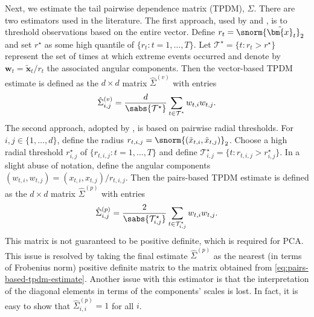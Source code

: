 \documentclass[en-GB, a4paper, nobind]{templates/bathreport}
\begin{document}
Next, we estimate the tail pairwise dependence matrix (TPDM), \(\Sigma\). There are two estimators used in the literature. The first approach, used by \textcite{cooleyDecompositionsDependenceHighdimensional2019} and \textcite{rohrbeckSimulatingFloodEvent2021}, is to threshold observations based on the entire vector. Define \(r_t=\snorm{\tilde{\bm{x}}_t}_2\) and set \(r^\star\) as some high quantile of \(\{r_t : t=1,\ldots,T\}\). Let \(\mathcal{T}^\star=\{t:r_t>r^\star\}\) represent the set of times at which extreme events occurred and denote by \(\bm{w}_{t}=\tilde{\bm{x}}_{t}/r_t\) the associated angular components. Then the vector-based TPDM estimate is defined as the \(d\times d\) matrix \(\hat{\Sigma}^{(v)}\) with entries
\begin{equation}
\hat{\Sigma}_{i,j}^{(v)} = \frac{d}{\sabs{\mathcal{T}^\star}}\sum_{t\in\mathcal{T}^\star} w_{t,i}w_{t,j}.
\label{eq:vector-based-tpdm-estimate}
\end{equation}
The second approach, adopted by \textcite{jiangPrincipalComponentAnalysis2020}, is based on pairwise radial thresholds. For \(i,j\in\{1,\ldots,d\}\), define the radius \(r_{t,i,j}=\snorm{(\tilde{x}_{t,i},\tilde{x}_{t,j})}_2\). Choose a high radial threshold \(r_{i,j}^\star\) of \(\{r_{t,i,j} : t=1,\ldots,T\}\) and define \(\mathcal{T}_{i,j}^\star=\{t:r_{t,i,j}>r_{i,j}^\star\}\). In a slight abuse of notation, define the angular components \((w_{t,i},w_{t,j})=(x_{t,i},x_{t,j})/r_{t,i,j}\). Then the pairs-based TPDM estimate is defined as the \(d\times d\) matrix \(\hat{\Sigma}^{(p)}\) with entries
\begin{equation}
\hat{\Sigma}_{i,j}^{(p)} = \frac{2}{\sabs{\mathcal{T}^\star_{i,j}}}\sum_{t\in\mathcal{T}^\star_{i,j}} w_{t,i}w_{t,j}.
\label{eq:pairs-based-tpdm-estimate}
\end{equation}
This matrix is not guaranteed to be positive definite, which is required for PCA. This issue is resolved by taking the final estimate \(\hat{\Sigma}^{(p)}\) as the nearest (in terms of Frobenius norm) positive definite matrix to the matrix obtained from \eqref{eq:pairs-based-tpdm-estimate}. Another issue with this estimator is that the interpretation of the diagonal elements in terms of the components' scales is lost. In fact, it is easy to show that \(\hat{\Sigma}_{i,i}^{(p)}=1\) for all \(i\).
\end{document}
